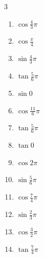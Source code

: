 


\setcounter{quesnum}{75}

\begin{multicols}{3}
\begin{enumerate}
  \itemsep=2pt
  \item $\displaystyle \cos{\frac{4}{3}\pi}$

  \item $\displaystyle \cos{\frac{\pi}{4}}$

  \item $\displaystyle \sin{\frac{4}{3}\pi}$

  \item $\displaystyle \tan{\frac{5}{6}\pi}$

  \item $\displaystyle \sin{0}$
        \phantom{$\displaystyle =0$}

  \item $\displaystyle \cos{\frac{11}{6}\pi}$

  \item $\displaystyle \tan{\frac{5}{6}\pi}$

  \item $\displaystyle \tan{0}$
        \phantom{$\displaystyle =0$}

  \item $\displaystyle \cos{2\pi}$
        \phantom{$\displaystyle =1$}

  \item $\displaystyle \sin{\frac{5}{6}\pi}$

  \item $\displaystyle \cos{\frac{7}{4}\pi}$

  \item $\displaystyle \sin{\frac{2}{3}\pi}$

  \item $\displaystyle \cos{\frac{3}{2}\pi}$
        \phantom{$\displaystyle =0$}

  \item $\displaystyle \tan{\frac{7}{4}\pi}$
        \phantom{$\displaystyle =-1$}


\end{enumerate}
\end{multicols}
